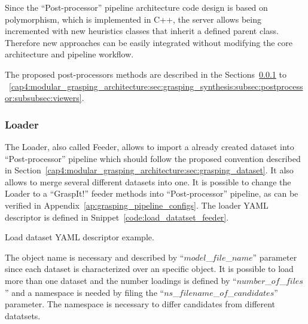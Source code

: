 Since the ``Post-processor'' pipeline architecture code design is based on polymorphism, which is implemented in C++, the server allows being incremented with new heuristics classes that inherit a defined parent class. Therefore new approaches can be easily integrated without modifying the core architecture and pipeline workflow. 

The proposed post-processors methods are described in the Sections~\ref{cap4:modular_grasping_architecture:sec:grasping_synthesis:subsec:graspit:subsubsec:loader} to ~\ref{cap4:modular_grasping_architecture:sec:grasping_synthesis:subsec:postprocessor:subsubsec:viewers}.

\subsubsection{Loader}
\label{cap4:modular_grasping_architecture:sec:grasping_synthesis:subsec:graspit:subsubsec:loader}

The Loader, also called Feeder, allows to import a already created dataset into ``Post-processor'' pipeline which should follow the proposed convention described in Section~\ref{cap4:modular_grasping_architecture:sec:grasping_dataset}. It also allows to merge several different datasets into one. It is possible to change the Loader to a ``GraspIt!'' feeder methods into ``Post-processor'' pipeline, as can be verified in Appendix~\ref{ap:grasping_pipeline_configs}. The loader YAML descriptor is defined in Snippet~\ref{code:load_datatset_feeder}. %

\begin{snippet}[h!]
\centering
{}
\caption{Load dataset YAML descriptor example.}
\label{code:load_datatset_feeder}
\end{snippet}

The object name is necessary and described by ``$model$\_$file$\_$name$'' parameter since each dataset is characterized over an specific object. It is possible to load more than one dataset and the number loadings is defined by ``$number$\_$of$\_$files$'' and a namespace is needed by filing the ``$ns$\_$filename$\_$of$\_$candidates$'' parameter. The namespace is necessary to differ candidates from different datatsets. 

